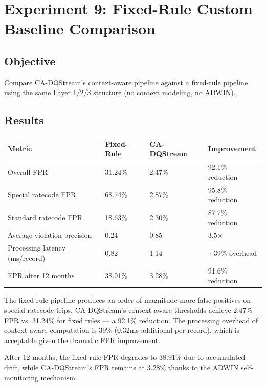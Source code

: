 \section{Experiment 9: Fixed-Rule Custom Baseline Comparison}

\subsection{Objective}

Compare CA-DQStream's context-aware pipeline against a fixed-rule pipeline using the same Layer 1/2/3 structure (no context modeling, no ADWIN).

\subsection{Results}

\begin{longtable}{|m{4cm}|m{4cm}|m{4cm}|m{2.5cm}|}
\hline
\textbf{Metric} & \textbf{Fixed-Rule} & \textbf{CA-DQStream} & \textbf{Improvement} \\ \hline
Overall FPR & 31.24\% & 2.47\% & 92.1\% reduction \\ \hline
Special ratecode FPR & 68.74\% & 2.87\% & 95.8\% reduction \\ \hline
Standard ratecode FPR & 18.63\% & 2.30\% & 87.7\% reduction \\ \hline
Average violation precision & 0.24 & 0.85 & 3.5$\times$ \\ \hline
Processing latency (ms/record) & 0.82 & 1.14 & +39\% overhead \\ \hline
FPR after 12 months & 38.91\% & 3.28\% & 91.6\% reduction \\ \hline
\end{longtable}

The fixed-rule pipeline produces an order of magnitude more false positives on special ratecode trips. CA-DQStream's context-aware thresholds achieve 2.47\% FPR vs. 31.24\% for fixed rules --- a 92.1\% reduction. The processing overhead of context-aware computation is 39\% (0.32ms additional per record), which is acceptable given the dramatic FPR improvement.

After 12 months, the fixed-rule FPR degrades to 38.91\% due to accumulated drift, while CA-DQStream's FPR remains at 3.28\% thanks to the ADWIN self-monitoring mechanism.

